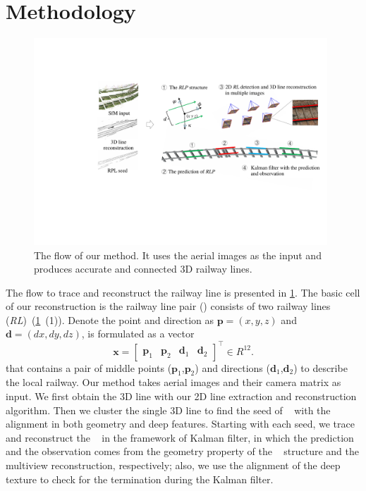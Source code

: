 \section{Methodology}
\begin{figure}
    \centering
    \includegraphics[width=0.98\textwidth]{images/overview.pdf}
    \caption{The flow of our method.
    It uses the aerial images as the input and produces accurate
    and connected 3D railway lines.}
    \label{fig_overview}
\end{figure}

The flow to trace and reconstruct the railway line is presented in \cref{fig_overview}.
The basic cell of our reconstruction is the railway line pair (\rlp) consists of two railway lines (\textit{RL})~(\cref{fig_overview}~(1)).
Denote the point and direction as
$\mathbf p=\left(x,y,z\right)$ and $\mathbf d=\left(dx,dy,dz\right)$,
\rlp is formulated as a vector
\begin{equation}
\mathbf x = \begin{bmatrix}
    \mathbf p_1 & \mathbf p_2 & \mathbf d_1  & \mathbf d_2 
\end{bmatrix}^ \top \in R^{12}.
\label{eq_prediction3} 
\end{equation}
that contains a pair of middle points ($\mathbf p_1$,$ \mathbf p_2$) and directions ($\mathbf d_1$,$\mathbf d_2$) to describe the local railway.
Our method takes aerial images and their camera matrix as input.
We first obtain the 3D line with our 2D line extraction and reconstruction algorithm.
Then
we cluster the single 3D line to find the seed of \rlp~ with the alignment in both geometry and deep features.
Starting with each seed,
we trace and reconstruct the \rlp~ in the framework of Kalman filter,
in which the prediction and the observation comes from the geometry property of the \rlp~ structure
and the multiview reconstruction,
respectively;
also,
we use the alignment of the deep texture to check for the termination during the Kalman filter.


